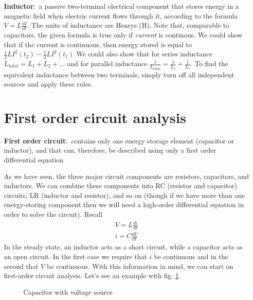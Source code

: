 \documentclass[nobib]{tufte-handout}
\newcommand{\defn}[2]{\noindent\textbf{#1}:\ #2}
\begin{document}
\defn{Inductor}{a passive two-terminal electrical 
component that stores energy in a magnetic field when 
electric current flows through it, according to the 
formula $V = L\frac{dI}{dt}$}. The units of inductance are Henrys (H).
Note that, comparable to capacitors, the given formula is true 
only if \emph{current} is continous. We could show that if the 
current is continuous, then energy stored is equal to $\frac{1}{2}LI^2(t_2) - \frac{1}{2}LI^2(t_1)$
We could also show that for series inductance $L_{total} = L_1+L_2+\dots$
and for parallel inductance $\frac{1}{L_{total}} = \frac{1}{L_1} + \frac{1}{L_1}$. 
To find the equivalent inductance between two terminals, simply turn off all 
independent sources and apply these rules. 

\section{First order circuit analysis}

\defn{First order circuit}{contains only one energy storage element 
(capacitor or inductor), and that can, therefore, be described using 
only a first order differential equation}

As we have seen, the three major circuit components are resistors, 
capacitors, and inductors. We can combine these components into 
RC (resistor and capacitor) circuits, LR (inductor and resistor), 
and so on (though if we have more than one energy-storing component then 
we will need a high-order differential equation in order to solve the 
circuit). Recall 
\begin{align*}
    V = L \frac{di}{dt} \\
    i = C\frac{dV}{dt}
\end{align*}
In the steady state, an inductor acts as a short circuit, 
while a capacitor acts as an open circuit. In the first case we 
require that $i$ be continuous and in the second that $V$ be 
continuous. With this information in mind, we can start on first-order 
circuit analysis. Let's see an example with fig. \ref{fig:capvolt}. 
\begin{figure}
    \center
    \caption{Capacitor with voltage source}
    \label{fig:capvolt}
\end{figure}
\end{document}
